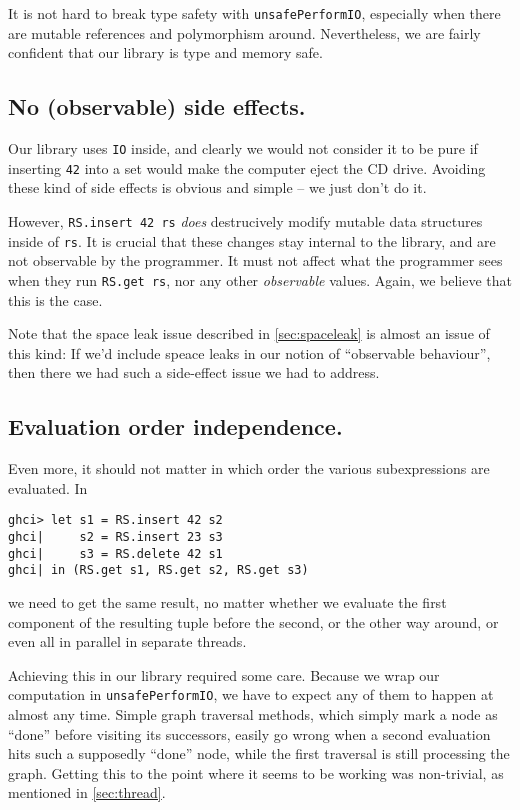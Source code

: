 \documentclass[manuscript,screen,acmsmall]{acmart}
\begin{document}
It is not hard to break type safety with \verb|unsafePerformIO|, especially when there are mutable references and polymorphism around. Nevertheless, we are fairly confident that our library is type and memory safe.

\subsection{No (observable) side effects.}

Our library uses \verb|IO| inside, and clearly we would not consider it to be pure if inserting \verb|42| into a set would make the computer eject the CD drive. Avoiding these kind of side effects is obvious and simple -- we just don't do it.

However, \verb|RS.insert 42 rs| \emph{does} destrucively modify mutable data structures inside of \verb|rs|. It is crucial that these changes stay internal to the library, and are not observable by the programmer. It must not affect what the programmer sees when they run \verb|RS.get rs|, nor any other \emph{observable} values. Again, we believe that this is the case.

Note that the space leak issue described in \cref{sec:spaceleak} is almost an issue of this kind: If we’d include speace leaks in our notion of “observable behaviour”, then there we had such a side-effect issue we had to address.

\subsection{Evaluation order independence.}

Even more, it should not matter in which order the various subexpressions are evaluated. In
\begin{verbatim}
ghci> let s1 = RS.insert 42 s2
ghci|     s2 = RS.insert 23 s3
ghci|     s3 = RS.delete 42 s1
ghci| in (RS.get s1, RS.get s2, RS.get s3)
\end{verbatim}
we need to get the same result, no matter whether we evaluate the first component of the resulting tuple before the second, or the other way around, or even all in parallel in separate threads.

Achieving this in our library required some care. Because we wrap our computation in \verb|unsafePerformIO|, we have to expect any of them to happen at almost any time. Simple graph traversal methods, which simply mark a node as “done” before visiting its successors, easily go wrong when a second evaluation hits such a supposedly “done” node, while the first traversal is still processing the graph. Getting this to the point where it seems to be working was non-trivial, as mentioned in \cref{sec:thread}.
\end{document}

